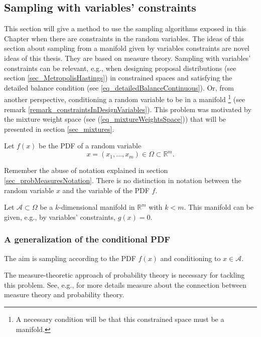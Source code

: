 \subsection{Sampling with variables' constraints} \label{sec_samplingWithVariablesConstraints}

This section will give a method to use the sampling algorithms exposed in this Chapter when there are constraints in the random variables.
The ideas of this section about sampling from a manifold given by variables constraints are novel ideas of this thesis. 
They are based on measure theory.
Sampling with variables' constraints can be relevant, e.g., when designing proposal distributions (see section \ref{sec_MetropolisHastings}) in constrained spaces and satisfying the detailed balance condition (see \ref{eq_detailedBalanceContinuous}).
Or, from another perspective, conditioning a random variable to be in a manifold
\footnote{A necessary condition will be that this constrained space must be a manifold.}
(see remark \ref{remark_constraintsInDesignVariables}).
This problem was motivated by the mixture weight space (see (\ref{eq_mixtureWeightsSpace})) that will be presented in section \ref{sec_mixtures}.

Let $f(x)$ be the PDF of a random variable 
$$x = (x_1, \dots, x_m) \in \Omega \subset \mathbb{R}^m.$$

\begin{remark}
  Remember the abuse of notation explained in section \ref{sec_probMeasuresNotation}. There is no distinction in notation between the random variable $x$ and the variable of the PDF $f$.
\end{remark}

Let $\mathcal{A} \subset \Omega$ be a $k$-dimensional manifold in $\mathbb{R}^m$ with $k<m$.
This manifold can be given, e.g., by variables' constraints, $g(x) = 0$.

\subsubsection{A generalization of the conditional PDF}

The aim is sampling according to the PDF $f(x)$ and conditioning to $x\in\mathcal{A}$.

The measure-theoretic approach of probability theory is necessary for tackling this problem. %
See, e.g., \textcite{bobrowski2005} for more details measure about the connection between measure theory and probability theory.

